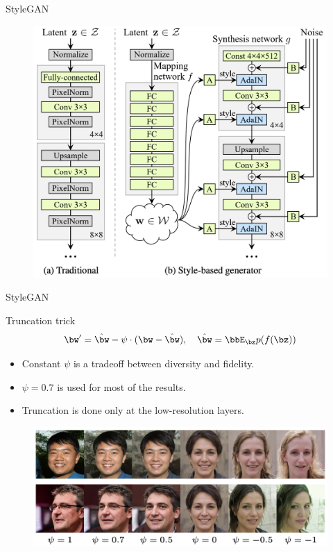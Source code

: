 \begin{frame}{StyleGAN}
	\begin{figure}
		\centering
		\includegraphics[width=0.8\linewidth]{figs/stylegan_scheme}
	\end{figure}

\end{frame}
\begin{frame}{StyleGAN}
	\begin{block}{Truncation trick}
		\vspace{-0.2cm}
		\[
			\bw' = \hat{\bw} - \psi \cdot (\bw - \hat{\bw}), \quad \hat{\bw} = \bbE_{\bz} p(f(\bz))
		\]
		\vspace{-0.2cm}
		\begin{itemize}
			\item Constant $\psi$ is a tradeoff between diversity and fidelity. 
			\item $\psi=0.7$ is used for most of the results.
			\item Truncation is done only at the low-resolution layers.
		\end{itemize}
		\begin{figure}
			\centering
			\includegraphics[width=0.8\linewidth]{figs/stylegan_truncation}
		\end{figure}
	\end{block}

\end{frame}
